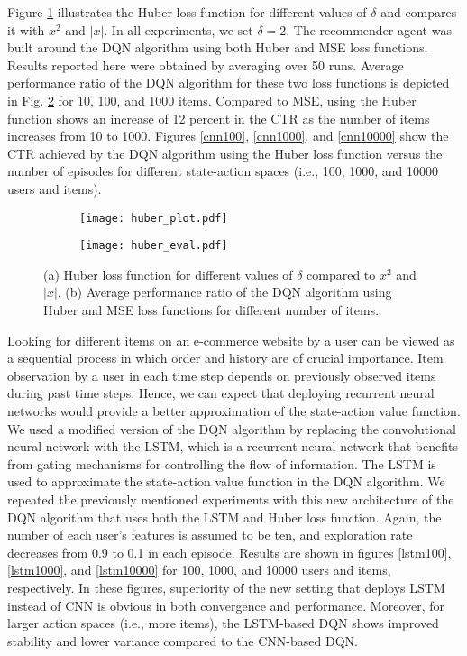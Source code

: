 \documentclass[journal]{IEEEtran}
\begin{document}
Figure \ref{Huber} illustrates the Huber loss function for different values of $\delta$ and compares it with $x^2$ and $|x|$. In all experiments, we set $\delta=2$. The recommender agent was built around the DQN algorithm using both  Huber and MSE loss functions. Results reported here were obtained by averaging over 50 runs. Average performance ratio of the DQN algorithm for these two loss functions is depicted in Fig. \ref{huber_eval_1} for 10, 100, and 1000 items. Compared to MSE, using the Huber function shows an increase of 12 percent in the CTR as the number of items increases from 10 to 1000. Figures \ref{cnn100}, \ref{cnn1000}, and \ref{cnn10000} show the CTR achieved by the DQN algorithm using the Huber loss function versus the number of episodes for different state-action spaces (i.e., 100, 1000, and 10000 users and items).

\begin{figure}[!ht]
\centering
\begin{subfigure}[b]{0.4\textwidth}
\texttt{[image: huber\_plot.pdf]}
\caption{}
\label{Huber}
\end{subfigure}
\quad
\begin{subfigure}[b]{0.38\textwidth}
\texttt{[image: huber\_eval.pdf]}
\caption{}
\label{huber_eval_1}
\end{subfigure}
\caption{(a) Huber loss function for different values of $\delta$ compared to $x^2$ and $|x|$. (b) Average performance ratio of the DQN algorithm using Huber and MSE loss functions for different number of items.}\label{Huber_loss}
\end{figure}

Looking for different items on an e-commerce website by a user can be viewed as a sequential process in which order and history are of crucial importance. Item observation by a user in each time step depends on previously observed items during past time steps. Hence, we can expect that deploying recurrent neural networks would provide a better approximation of the state-action value function. We used a modified version of the DQN algorithm by replacing the convolutional neural network with the LSTM, which is a recurrent neural network that benefits from gating mechanisms for controlling the flow of information. The LSTM is used to approximate the state-action value function in the DQN algorithm. We repeated the previously mentioned experiments with this new architecture of the DQN algorithm that uses both the LSTM and Huber loss function. Again, the number of each user's features is assumed to be ten, and exploration rate decreases from 0.9 to 0.1 in each episode. Results are shown in figures \ref{lstm100}, \ref{lstm1000}, and \ref{lstm10000} for 100, 1000, and 10000 users and items, respectively. In these figures, superiority of the new setting that deploys LSTM instead of CNN is obvious in both convergence and performance. Moreover, for larger action spaces (i.e., more items), the LSTM-based DQN shows improved stability and lower variance compared to the CNN-based DQN. 
\end{document}

